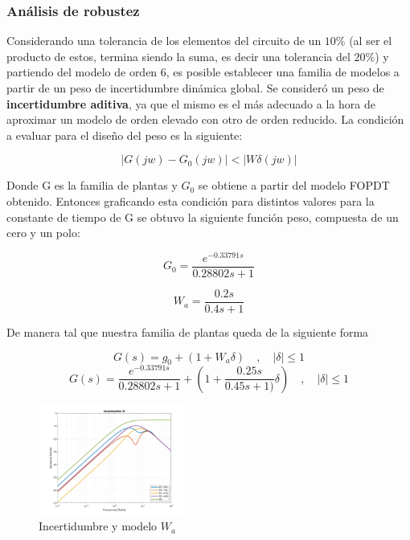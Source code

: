 \documentclass[letterpaper, 10 pt, conference]{ieeeconf}  %
\begin{document}
\subsubsection{Análisis de robustez}

Considerando una tolerancia de los elementos del circuito de un $10\%$ (al ser el producto de estos, termina siendo la suma, es decir una tolerancia del $20\%$) y partiendo del modelo de orden 6, es posible establecer una familia de modelos a partir de un peso de incertidumbre dinámica global. Se consideró un peso de \textbf{incertidumbre aditiva}, ya que el mismo es el más adecuado a la hora de aproximar un modelo de orden elevado con otro de orden reducido. La condición a evaluar para el diseño del peso es la siguiente:

\begin{equation*}
  |G(jw) - G_0(jw)| < |W\delta(jw)|
\end{equation*}

Donde G es la familia de plantas y $G_0$ se obtiene a partir del modelo FOPDT obtenido. Entonces graficando esta condición para distintos valores para la constante de tiempo de G se obtuvo la siguiente función peso, compuesta de un cero y un polo:

\begin{equation*}
  G_0 = \frac{e^{-0.33791s}}{0.28802s+1}
\end{equation*}

\begin{equation*}
  W_a = \frac{0.2s}{0.4s+1}
\end{equation*}

De manera tal que nuestra familia de plantas queda de la siguiente forma

\begin{equation*}
  G(s) = g_0 + (1 + W_{a}\delta)  \hspace{1em},\hspace{1em} |\delta| \leq 1
\end{equation*}
\begin{equation*}
  G(s) = \frac{e^{-0.33791s}}{0.28802s+1} + (1 + \frac{0.25s}{0.45s+1)}\delta) \hspace{1em},\hspace{1em} |\delta| \leq 1
\end{equation*}

\begin{figure}[H]
  \centering
  \includegraphics[width=0.43\textwidth]{./IMAGENES/wa.png}
  \caption{Incertidumbre y modelo $W_a$}
  \label{fig:incertidumbres}
\end{figure}
\end{document}
